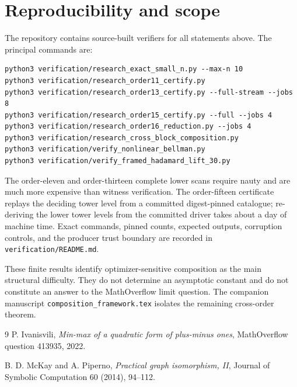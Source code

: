 \documentclass[11pt]{article}
\theoremstyle{remark}
\begin{document}
\section{Reproducibility and scope}

The repository contains source-built verifiers for all statements above.
The principal commands are:
\begin{verbatim}
python3 verification/research_exact_small_n.py --max-n 10
python3 verification/research_order11_certify.py
python3 verification/research_order13_certify.py --full-stream --jobs 8
python3 verification/research_order15_certify.py --full --jobs 4
python3 verification/research_order16_reduction.py --jobs 4
python3 verification/research_cross_block_composition.py
python3 verification/verify_nonlinear_bellman.py
python3 verification/verify_framed_hadamard_lift_30.py
\end{verbatim}
The order-eleven and order-thirteen complete lower scans require nauty and
are much more expensive than witness verification.  The order-fifteen
certificate replays the deciding tower level from a committed digest-pinned
catalogue; re-deriving the lower tower levels from the committed driver
takes about a day of machine time.  Exact commands, pinned counts, expected
outputs, corruption controls, and the producer trust boundary are recorded
in \texttt{verification/README.md}.

These finite results identify optimizer-sensitive composition as the main
structural difficulty.  They do not determine an asymptotic constant and do
not constitute an answer to the MathOverflow limit question.  The companion
manuscript \texttt{composition\_framework.tex} isolates the remaining
cross-order theorem.

\begin{thebibliography}{9}
P. Ivanisvili,
\emph{Min-max of a quadratic form of plus-minus ones},
MathOverflow question 413935, 2022.

B. D. McKay and A. Piperno,
\emph{Practical graph isomorphism, II},
Journal of Symbolic Computation 60 (2014), 94--112.
\end{thebibliography}
\end{document}
